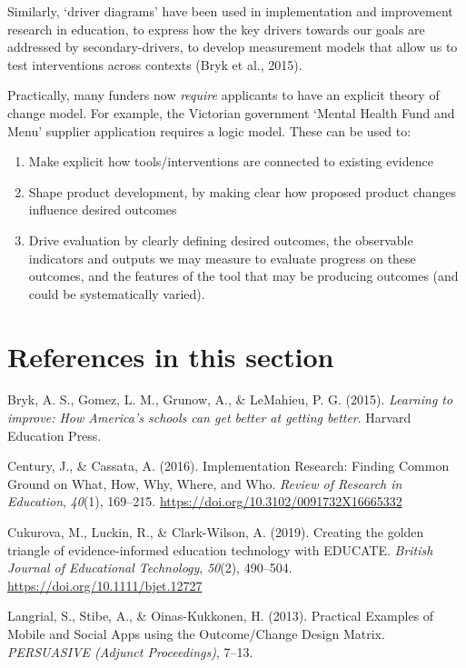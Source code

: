\documentclass[
]{book}
\begin{document}
Similarly, `driver diagrams' have been used in implementation and
improvement research in education, to express how the key drivers
towards our goals are addressed by secondary-drivers, to develop
measurement models that allow us to test interventions across contexts
(Bryk et al., 2015).

Practically, many funders now \emph{require} applicants to have an explicit
theory of change model. For example, the Victorian government `Mental
Health Fund and Menu' supplier application requires a logic model. These
can be used to:

\begin{enumerate}
\def\labelenumi{\arabic{enumi}.}
\item
  Make explicit how tools/interventions are connected to existing
  evidence
\item
  Shape product development, by making clear how proposed product
  changes influence desired outcomes
\item
  Drive evaluation by clearly defining desired outcomes, the
  observable indicators and outputs we may measure to evaluate
  progress on these outcomes, and the features of the tool that may be
  producing outcomes (and could be systematically varied).
\end{enumerate}

\hypertarget{references-in-this-section}{%
\section{References in this section}\label{references-in-this-section}}

Bryk, A. S., Gomez, L. M., Grunow, A., \& LeMahieu, P. G. (2015).
\emph{Learning to improve: How America's schools can get better at getting
better}. Harvard Education Press.

Century, J., \& Cassata, A. (2016). Implementation Research: Finding
Common Ground on What, How, Why, Where, and Who. \emph{Review of Research in
Education}, \emph{40}(1), 169--215. \url{https://doi.org/10.3102/0091732X16665332}

Cukurova, M., Luckin, R., \& Clark-Wilson, A. (2019). Creating the golden
triangle of evidence-informed education technology with EDUCATE.
\emph{British Journal of Educational Technology}, \emph{50}(2), 490--504.
\url{https://doi.org/10.1111/bjet.12727}

Langrial, S., Stibe, A., \& Oinas-Kukkonen, H. (2013). Practical Examples
of Mobile and Social Apps using the Outcome/Change Design Matrix.
\emph{PERSUASIVE (Adjunct Proceedings)}, 7--13.
\end{document}
